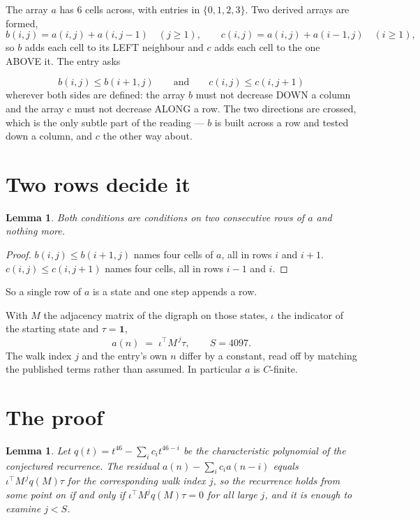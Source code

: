 \documentclass[11pt,a4paper]{article}
\theoremstyle{plain}
\newtheorem{lemma}[theorem]{Lemma}
\theoremstyle{definition}
\begin{document}
The array $a$ has $6$ cells across, with entries in $\{0,1,2,3\}$. Two derived arrays are formed,
\[
b(i,j)=a(i,j)+a(i,j-1)\quad(j\ge1),\qquad c(i,j)=a(i,j)+a(i-1,j)\quad(i\ge1),
\]
so $b$ adds each cell to its LEFT neighbour and $c$ adds each cell to the one ABOVE it. The
entry asks

\[
b(i,j)\le b(i{+}1,j)\qquad\text{and}\qquad c(i,j)\le c(i,j{+}1)
\]
wherever both sides are defined: the array $b$ must not decrease DOWN a column and the array
$c$ must not decrease ALONG a row. The two directions are crossed, which is the only subtle
part of the reading --- $b$ is built across a row and tested down a column, and $c$ the other
way about.


\section{Two rows decide it}

\begin{lemma}\label{lem:win}
Both conditions are conditions on two consecutive rows of $a$ and nothing more.
\end{lemma}

\begin{proof}
$b(i,j)\le b(i{+}1,j)$ names four cells of $a$, all in rows $i$ and $i+1$. $c(i,j)\le
c(i,j{+}1)$ names four cells, all in rows $i-1$ and $i$.
\end{proof}

So a single row of $a$ is a state and one step appends a row.

With $M$ the adjacency matrix of the digraph on those states, $\iota$ the indicator of the
starting state and $\tau=\mathbf{1}$,
\[
a(n)\;=\;\iota^{\!\top}M^{\,j}\tau ,\qquad S=4097.
\]
The walk index $j$ and the entry's own $n$ differ by a constant, read off by matching the
published terms rather than assumed. In particular $a$ is $C$-finite.

\section{The proof}

\begin{lemma}\label{lem:crit}
Let $q(t)=t^{46}-\sum_i c_it^{46-i}$ be the characteristic polynomial of the
conjectured recurrence. The residual $a(n)-\sum_ic_ia(n-i)$ equals
$\iota^{\!\top}M^{\,j}q(M)\tau$ for the corresponding walk index $j$, so the recurrence
holds from some point on if and only if $\iota^{\!\top}M^{j}q(M)\tau=0$ for all large $j$,
and it is enough to examine $j<S$.
\end{lemma}
\end{document}
